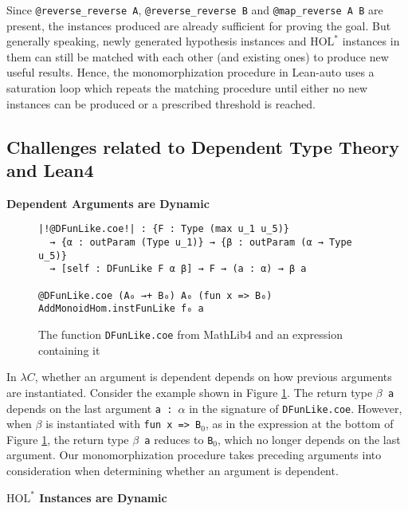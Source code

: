 Since \texttt{@reverse\_reverse A}, \texttt{@reverse\_reverse B} and \texttt{@map\_reverse A B}
are present, the instances produced are already sufficient for proving the goal.
But generally speaking, newly generated hypothesis instances and $\text{HOL}^*$ instances
in them can still be matched with each other (and existing ones) to produce new useful results.
Hence, the monomorphization procedure in Lean-auto uses a saturation loop which
repeats the matching procedure until either no new instances can be produced or a prescribed
threshold is reached.

\subsection{Challenges related to Dependent Type Theory and Lean4} \label{exqdet}

\noindent \textbf{Dependent Arguments are Dynamic}

\begin{figure}
  \begin{CenteredBox}
    \begin{lstlisting}[style=leanHH]
|!@DFunLike.coe!| : {F : Type (max u_1 u_5)}
  → {α : outParam (Type u_1)} → {β : outParam (α → Type u_5)}
  → [self : DFunLike F α β] → F → (a : α) → β a

@DFunLike.coe (A₀ →+ B₀) A₀ (fun x => B₀) AddMonoidHom.instFunLike f₀ a 
    \end{lstlisting}
  \end{CenteredBox}
  \caption{The function \texttt{DFunLike.coe} from MathLib4 and an expression
  containing it}
  \label{dfun}
\end{figure}

  In $\lambda C$, whether an argument is dependent depends on how previous arguments
are instantiated. Consider the example shown in Figure \ref{dfun}. The return
type \texttt{$\beta$ a} depends on the last argument \texttt{a : $\alpha$} in the signature of
\texttt{DFunLike.coe}. However, when $\beta$ is instantiated with \texttt{fun x => B$_0$}, as in the
expression at the bottom of Figure \ref{dfun}, the return type \texttt{$\beta$ a} reduces to \texttt{B$_0$},
which no longer depends on the last argument. Our monomorphization procedure takes preceding arguments into
consideration when determining whether an argument is dependent.

\noindent \textbf{$\text{HOL}^*$ Instances are Dynamic}

